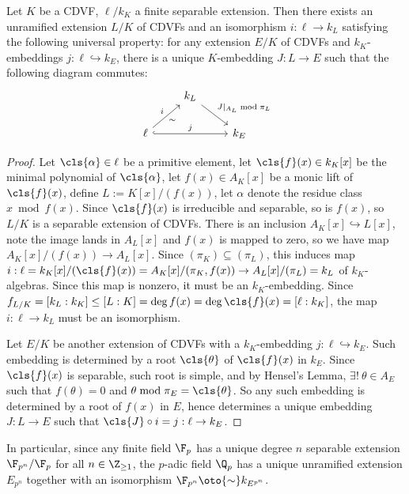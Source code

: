 \documentclass[11pt]{amsart}
\begin{document}
\begin{prop}
    \label{prop:unramified-cdvf}
    Let $K$ be a CDVF, $\ell/k_K$ a finite separable extension.  Then there
    exists an unramified extension $L/K$ of CDVFs and an isomorphism $i : \ell
    \to k_L$ satisfying the following universal property:  for any extension
    $E/K$ of CDVFs and $k_K$-embeddings $j : \ell \hookrightarrow k_E$, there is a
    unique $K$-embedding $J : L \to E$ such that the following diagram commutes:
    \[
      \begin{tikzcd}
        & k_L \ar{rd}{J|_{A_L} \bmod{\pi_L}} &\\
        \ell \ar{ru}{i}[swap]{\sim} \ar[hook]{rr}{j} & & k_E
      \end{tikzcd}
    \]
\end{prop}


\begin{proof}
    Let $\cls{\alpha} \in \ell$ be a primitive element, let $\cls{f}(x) \in
    k_K[x]$ be the minimal polynomial of $\cls{\alpha}$, let $f(x) \in A_K[x]$
    be a monic lift of $\cls{f}(x)$, define $L := K[x]/(f(x))$, let $\alpha$
    denote the residue class $x \bmod{f(x)}$.
    Since $\cls{f}(x)$ is irreducible and separable, so is $f(x)$, so $L/K$ is a
    separable extension of CDVFs.  There is an inclusion $A_K[x] \hookrightarrow
    L[x]$, note the image lands in $A_L[x]$ and $f(x)$ is mapped to zero, so we
    have map $A_K[x]/(f(x)) \to A_L[x]$.  Since $(\pi_K) \subseteq
    (\pi_L)$, this induces map $i : \ell = k_K[x]/(\cls{f}(x)) = A_K[x]/(\pi_K,
    f(x)) \to A_L[x]/(\pi_L) = k_L$ of $k_K$-algebras.  Since this map is
    nonzero, it must be an $k_K$-embedding.  Since $f_{L/K} = [k_L : k_K] \leq
    [L : K] = \deg f(x) = \deg \cls{f}(x) = [\ell : k_K]$, the map $i : \ell \to
    k_L$ must be an isomorphism.

    Let $E/K$ be another extension of CDVFs with a $k_K$-embedding $j : \ell
    \hookrightarrow k_E$.  Such embedding is determined by a root $\cls{\theta}$
    of $\cls{f}(x)$ in $k_E$.  Since $\cls{f}(x)$ is separable, such root is
    simple, and by Hensel's Lemma, $\exists!\ \theta \in A_E$ such that
    $f(\theta) = 0$ and $\theta \bmod{\pi_E} = \cls{\theta}$.  So any such
    embedding is determined by a root of $f(x)$ in $E$, hence determines a
    unique embedding $J : L \to E$ such that $\cls{J} \circ i = j : \ell \to
    k_E$.
\end{proof}

In particular, since any finite field $\F_p$ has a unique degree $n$ separable
extension $\F_{p^n}/\F_p$ for all $n \in \Z_{\geq 1}$, the $p$-adic field $\Q_p$
has a unique unramified extension $E_{p^n}$ together with an isomorphism
$\F_{p^n} \oto{\sim} k_{E^{p^n}}$.
\end{document}
